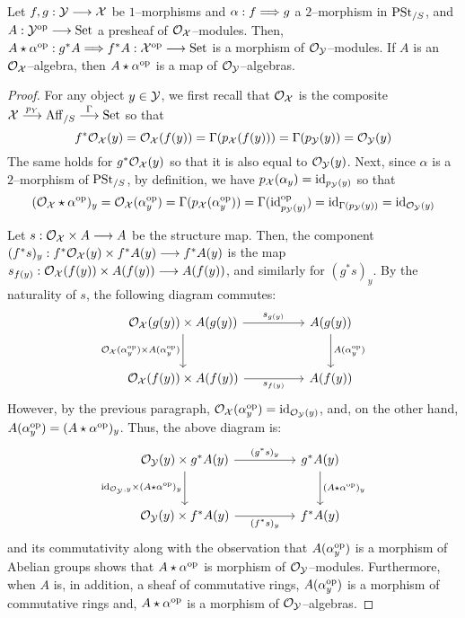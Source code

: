 \documentclass[11pt]{amsart}
\begin{document}
\begin{prop}\label{prop:pullback-nat-OX-alg}
Let $f, g : \mcY \to \mcX$ be $1$--morphisms and $\alpha : f \To g$ a
$2$--morphism in $\mathrm{PSt}_{/S}$, and $A : \mcY^\op \to \Set$ a presheaf of
$\mathcal{O}_\mathcal{X}$--modules. Then,
$A \star \alpha^\op : g^*A \To f^*A : \mcX^\op \to \Set$ is a morphism of
$\mathcal{O}_\mathcal{Y}$--modules. If $A$ is an $\mathcal{O}_\mathcal{X}$--algebra, then
$A \star \alpha^{\mathrm{op}}$ is a map of $\mathcal{O}_\mathcal{Y}$--algebras.
\end{prop}
\begin{proof}
For any object $y \in \mathcal{Y}$,
we first recall that $\mathcal{O}_\mathcal{X}$ is the composite
$\mcX \to[p_Y] \Aff_{/S} \to[\Gamma] \Set$ so that
\[
f^*\mathcal{O}_\mathcal{X}(y) = \mathcal{O}_\mathcal{X}(f(y)) = \Gamma(p_\mathcal{X}(f(y))) = \Gamma(p_\mathcal{Y}(y))
  = \mathcal{O}_\mathcal{Y}(y)
\]
The same holds for $g^*\mathcal{O}_\mathcal{X}(y)$ so that it is also equal to
$\mathcal{O}_\mathcal{Y}(y)$. Next, since $\alpha$ is a $2$--morphism of $\mathrm{PSt}_{/S}$,
by definition, we have $p_\mathcal{X}(\alpha_y) = \mathrm{id}_{p_\mathcal{Y}(y)}$
so that
\[
(\mathcal{O}_\mathcal{X} \star \alpha^{\mathrm{op}})_y
= \mathcal{O}_\mathcal{X}(\alpha_y^{\mathrm{op}})
= \Gamma(p_\mathcal{X}(\alpha_y^{\mathrm{op}}))
= \Gamma(\mathrm{id}_{p_\mathcal{Y}(y)}^{\mathrm{op}})
= \mathrm{id}_{\Gamma(p_\mathcal{Y}(y))}
= \mathrm{id}_{\mathcal{O}_\mathcal{Y}(y)}
\]

Let $s : \mcO_\mcX \times A \to A$ be the structure map. Then, the component
$(f^*s)_y : f^*\mcO_\mcX(y) \times f^*A(y) \to f^*A(y)$ is the map
$s_{f(y)} : \mcO_\mcX(f(y)) \times A(f(y)) \to A(f(y))$, and similarly
for $(g^*s)_y$.
By the naturality of $s$, the following diagram commutes:
\[\begin{tikzcd}[row sep=large, column sep=huge]
\mcO_\mcX(g(y)) \times A(g(y))
  \ar[r, "s_{g(y)}"]
  \ar[d, "\mcO_\mcX(\alpha_y^\op) \times A(\alpha_y^\op)" left] &
A(g(y)) \ar[d, "A(\alpha^\op_y)"] \\
\mcO_\mcX(f(y)) \times A(f(y)) \ar[r, "s_{f(y)}" below] &
A(f(y))
\end{tikzcd}\]
However, by the previous paragraph,
$\mathcal{O}_\mathcal{X}(\alpha_y^{\mathrm{op}}) = \mathrm{id}_{\mathcal{O}_\mathcal{Y}(y)}$, and, on the other hand,
$A(\alpha_y^{\mathrm{op}}) = (A \star \alpha^{\mathrm{op}})_y$. Thus, the above diagram is:
\[\begin{tikzcd}[row sep=large, column sep=huge]
\mcO_\mcY(y) \times g^*A(y)
  \ar[r, "(g^*s)_y"]
  \ar[d, "\id_{\mcO_\mcY, y} \times (A \star \alpha^\op)_y" left] &
g^*A(y) \ar[d, "(A \star \alpha^\op)_y"] \\
\mcO_\mcY(y) \times f^*A(y) \ar[r, "(f^*s)_y" below] &
f^*A(y)
\end{tikzcd}\]
and its commutativity along with the observation that $A(\alpha_y^{\mathrm{op}})$ is a
morphism of Abelian groups shows that $A \star \alpha^{\mathrm{op}}$ is morphism of
$\mathcal{O}_\mathcal{Y}$--modules. Furthermore, when $A$ is, in addition, a sheaf
of commutative rings, $A(\alpha_y^{\mathrm{op}})$ is a morphism of commutative rings
and, $A \star \alpha^{\mathrm{op}}$ is a morphism of $\mathcal{O}_\mathcal{Y}$--algebras.
\end{proof}
\end{document}
